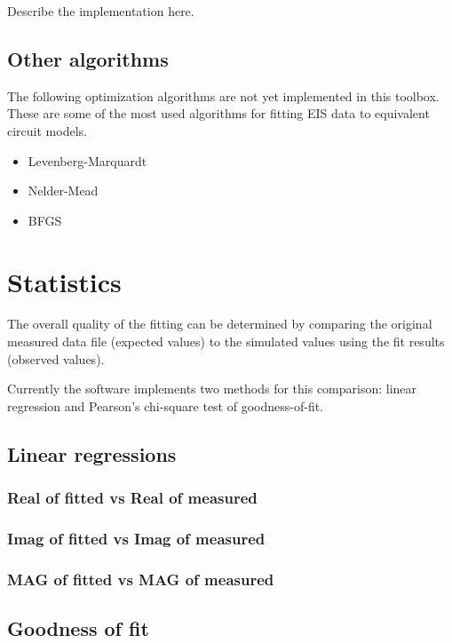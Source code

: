 \documentclass[10pt,a4paper,oneside]{book}
\begin{document}
Describe the implementation here.

\section{Other algorithms}

The following optimization algorithms are not yet implemented in this toolbox. These are some of the most used algorithms for fitting EIS data to equivalent circuit models.

\begin{itemize}
	\item Levenberg-Marquardt
	\item Nelder-Mead
	\item BFGS
\end{itemize}



\chapter{Statistics}

The overall quality of the fitting can be determined by comparing the original measured data file (expected values) to the simulated values using the fit results (observed values).

Currently the software implements two methods for this comparison: linear regression and Pearson's chi-square test of goodness-of-fit.


\section{Linear regressions}



\subsection{Real of fitted vs Real of measured}

\subsection{Imag of fitted vs Imag of measured}

\subsection{MAG of fitted vs MAG of measured}

\section{Goodness of fit}
\end{document}
